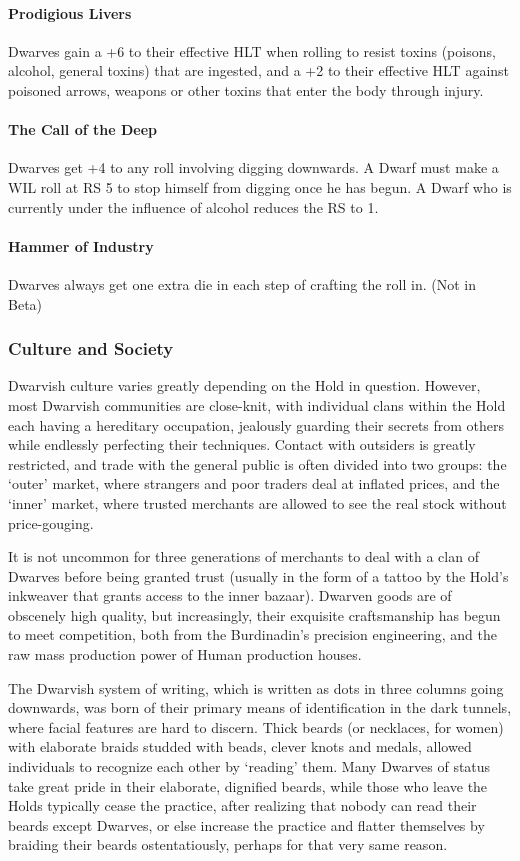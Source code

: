 \documentclass[oneside,11pt,english]{book}
\begin{document}
\paragraph{Prodigious Livers}
Dwarves gain a +6 to their effective HLT when rolling to resist toxins (poisons, alcohol, general 
toxins) that are ingested, and a +2 to their effective HLT against poisoned arrows, weapons or 
other toxins that enter the body through injury. 
\paragraph{The Call of the Deep}
Dwarves get +4 to any roll involving digging downwards. A Dwarf must make a WIL roll at RS 5 
to stop himself from digging once he has begun. A Dwarf who is currently under the influence of 
alcohol reduces the RS to 1. 
\paragraph{Hammer of Industry}
Dwarves always get one extra die in each step of crafting the roll in. (Not in Beta) 
\subsubsection*{Culture and Society} 
Dwarvish culture varies greatly depending on the Hold in question. However, most Dwarvish 
communities are close-knit, with individual clans within the Hold each having a hereditary occupation, 
jealously guarding their secrets from others while endlessly perfecting their techniques. Contact with 
outsiders is greatly restricted, and trade with the general public is often divided into two groups: the 
‘outer’ market, where strangers and poor traders deal at inflated prices, and the ‘inner’ market, where 
trusted merchants are allowed to see the real stock without price-gouging. 


It is not uncommon for three generations of merchants to deal with a clan of Dwarves before being 
granted trust (usually in the form of a tattoo by the Hold's inkweaver that grants access to the inner 
bazaar). Dwarven goods are of obscenely high quality, but increasingly, their exquisite craftsmanship has 
begun to meet competition, both from the Burdinadin's precision engineering, and the raw mass 
production power of Human production houses. 

 
The Dwarvish system of writing, which is written as dots in three columns going downwards, was born of 
their primary means of identification in the dark tunnels, where facial features are hard to discern. Thick 
beards (or necklaces, for women) with elaborate braids studded with beads, clever knots and medals, 
allowed individuals to recognize each other by ‘reading’ them. Many Dwarves of status take great pride 
in their elaborate, dignified beards, while those who leave the Holds typically cease the practice, after 
realizing that nobody can read their beards except Dwarves, or else increase the practice and flatter 
themselves by braiding their beards ostentatiously, perhaps for that very same reason. 
\end{document}
